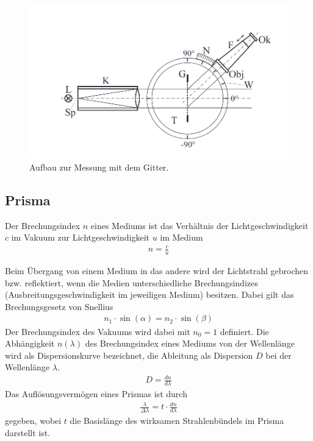 \documentclass{article}
\begin{document}
\begin{figure}[H]
\centering
\includegraphics[scale=1.5]{gitter.png}
\caption{Aufbau zur Messung mit dem Gitter.}
\label{fig:gitter}
\end{figure}


\subsection{Prisma}

Der Brechungsindex $n$ eines Mediums ist das Verhältnis der Lichtgeschwindigkeit $c$ im Vakuum zur Lichtgeschwindigkeit $u$ im Medium
\begin{align*}
n = \frac{c}{u}
\end{align*}

Beim Übergang von einem Medium in das andere wird der Lichtstrahl gebrochen bzw. reflektiert, wenn die Medien unterschiedliche Brechungsindizes (Ausbreitungsgeschwindigkeit im jeweiligen Medium) besitzen. Dabei gilt das Brechungsgesetz von Snellius
\begin{align*}
n_1\cdot\sin(\alpha) = n_2\cdot\sin(\beta)
\end{align*}
Der Brechungsindex des Vakuums wird dabei mit $n_0 = 1$ definiert. Die Abhängigkeit $n(\lambda)$ des Brechungsindex eines Mediums von der Wellenlänge wird als Dispersionskurve bezeichnet, die Ableitung als Dispersion $D$ bei der Wellenlänge $\lambda$.
\begin{align*}
D = \frac{dn}{d\lambda}
\end{align*}
Das Auflösungsvermögen eines Prismas ist durch
\begin{align*}
\frac{\lambda}{\Delta\lambda} = t\cdot \frac{dn}{d\lambda}
\end{align*}
gegeben, wobei $t$ die Basislänge des wirksamen Strahlenbündels im Prisma darstellt ist.
\end{document}
